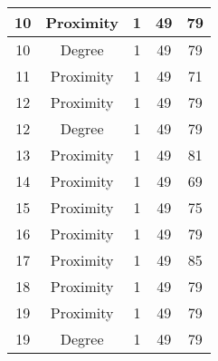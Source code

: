 \documentclass[results.tex]{subfiles}
\begin{document}
\begin{center}
\begin{tabular}{| c || c | c | c | c |}
            \hline
            10                      & Proximity                    & 1                      & 49                      & 79                   \\
            \hline
            10                      & Degree                       & 1                      & 49                      & 79                   \\
            \hline
            11                      & Proximity                    & 1                      & 49                      & 71                   \\
            \hline
            12                      & Proximity                    & 1                      & 49                      & 79                   \\
            \hline
            12                      & Degree                       & 1                      & 49                      & 79                   \\
            \hline
            13                      & Proximity                    & 1                      & 49                      & 81                   \\
            \hline
            14                      & Proximity                    & 1                      & 49                      & 69                   \\
            \hline
            15                      & Proximity                    & 1                      & 49                      & 75                   \\
            \hline
            16                      & Proximity                    & 1                      & 49                      & 79                   \\
            \hline
            17                      & Proximity                    & 1                      & 49                      & 85                   \\
            \hline
            18                      & Proximity                    & 1                      & 49                      & 79                   \\
            \hline
            19                      & Proximity                    & 1                      & 49                      & 79                   \\
            \hline
            19                      & Degree                       & 1                      & 49                      & 79                   \\

\end{tabular}
\end{center}
\end{document}
